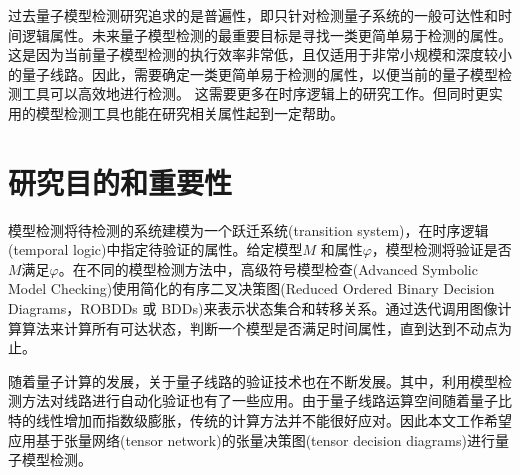 过去量子模型检测研究追求的是普遍性，即只针对检测量子系统的一般可达性和时间逻辑属性。未来量子模型检测的最重要目标是寻找一类更简单易于检测的属性。这是因为当前量子模型检测的执行效率非常低，且仅适用于非常小规模和深度较小的量子线路。因此，需要确定一类更简单易于检测的属性，以便当前的量子模型检测工具可以高效地进行检测\citep{ying2021model}。
这需要更多在时序逻辑上的研究工作。但同时更实用的模型检测工具也能在研究相关属性起到一定帮助。




\section{研究目的和重要性}
模型检测将待检测的系统建模为一个跃迁系统(transition system)，在时序逻辑(temporal logic)中指定待验证的属性。给定模型\(M\) 和属性\(\varphi\)，模型检测将验证是否\(M\)满足\(\varphi\)。在不同的模型检测方法中，高级符号模型检查(Advanced Symbolic Model Checking)\citep{Grobelna_2015}使用简化的有序二叉决策图(Reduced Ordered Binary Decision Diagrams，ROBDDs 或 BDDs)\citep{Bryant_1986}来表示状态集合和转移关系。通过迭代调用图像计算算法来计算所有可达状态，判断一个模型是否满足时间属性，直到达到不动点为止。

随着量子计算的发展，关于量子线路的验证技术也在不断发展\citep{viamontes2007checking,burgholzer2020advanced}。其中，利用模型检测方法对线路进行自动化验证也有了一些应用。由于量子线路运算空间随着量子比特的线性增加而指数级膨胀，传统的计算方法并不能很好应对。因此本文工作希望应用基于张量网络(tensor network)的张量决策图(tensor decision diagrams)进行量子模型检测。

